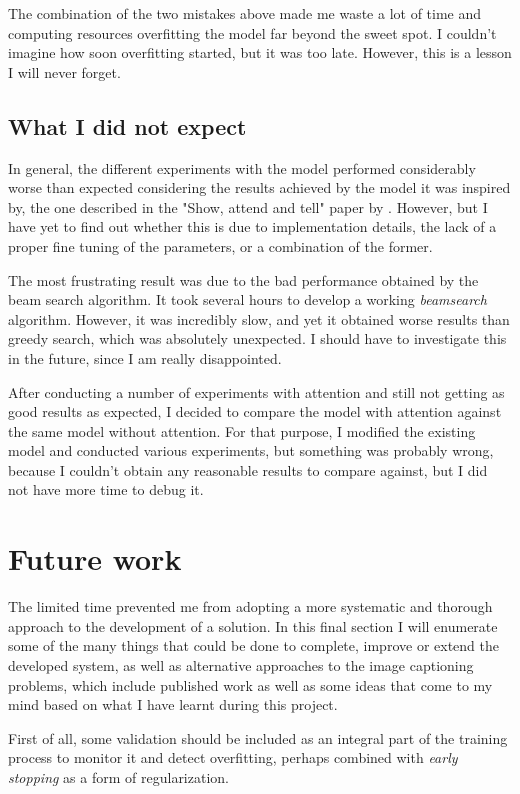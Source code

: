 The combination of the two mistakes above made me waste a lot of time and computing resources overfitting the model far beyond the sweet spot. I couldn't imagine how soon overfitting started, but it was too late. However, this is a lesson I will never forget. 

\subsection{What I did not expect}

In general, the different experiments with the model performed  considerably worse than expected considering the results achieved by the model it was inspired by, the one described in the "Show, attend and tell" paper by \citet{Xu2015}. However, but I have yet to find out whether this is due to implementation details, the lack of a proper fine tuning of the parameters, or a combination of the former.

The most frustrating result was due to the bad performance obtained by the beam search algorithm. It took several hours to develop a working \textit{beamsearch} algorithm. However, it was incredibly slow, and yet it obtained worse results than greedy search, which was absolutely unexpected. I should have to investigate this in the future, since I am really disappointed.

After conducting a number of experiments with attention and still not getting as good results as expected, I decided to compare the model with attention against the same model without attention. For that purpose, I modified the existing model and conducted various experiments, but something was probably wrong, because I couldn't obtain any reasonable results to compare against, but I did not have more time to debug it.

\section{Future work}

The limited time prevented me from adopting a more systematic and thorough approach to the development of a solution. In this final section I will enumerate some of the many things that could be done to complete, improve or extend the developed system, as well as alternative approaches to the image captioning problems, which include published work as well as some ideas that come to my mind based on what I have learnt during this project.

First of all, some validation should be included as an integral part of the training process to monitor it and detect overfitting, perhaps combined with \textit{early stopping} as a form of regularization.

